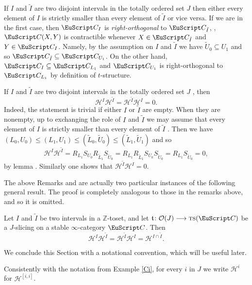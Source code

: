 \begin{remark}
If $I$ and $\tilde{I}$ are two disjoint intervals in the totally ordered set $J$ then either every element of $I$ is strictly smaller than every element of $\tilde{I}$ or vice versa. If we are in the first case, then $\C_{I}$ is \emph{right-orthogonal} to $\C_{\tilde{I}}$, \ie, $\C(X,Y)$ is contractible whenever $X\in \C_{\tilde{I}}$ and $Y\in \C_{I}$. Namely, by the assumption on $I$ and $\tilde{I}$ we have $\tilde{U}_0\subseteq U_1$ and so $\C_{\tilde{I}}\subseteq \C_{U_1}$. On the other hand, $\C_I\subseteq \C_{L_1}$ and $\C_{U_1}$ is right-orthogonal to $\C_{L_1}$ by definition of $t$-structure.
\end{remark}
\begin{remark}\label{rem.questaltro}
If $I$ and $\tilde{I}$ are two disjoint intervals in the totally ordered set $J$ , then 
\[
\mathcal{H}^I\mathcal{H}^{\tilde{I}}=\mathcal{H}^{\tilde{I}}\mathcal{H}^I=0.
\] 
Indeed, the statement is trivial if either $I$ or $\tilde{I}$ are empty. When they are nonempty, up to exchanging the role of $I$ and $\tilde{I}$ we may assume that every element of $I$ is strictly smaller than every element of $\tilde{I}$ . Then we have $(L_0,U_0)\leq (L_1,U_1)\leq (\tilde{L}_0,\tilde{U}_0)\leq (\tilde{L}_1,\tilde{U}_1)$ and so
\[
\mathcal{H}^I\mathcal{H}^{\tilde{I}}=R_{L_1}S_{U_0}R_{\tilde{L}_1}S_{\tilde{U}_0}=R_{L_1}R_{\tilde{L}_1}S_{U_0}S_{\tilde{U}_0}=R_{L_1}S_{\tilde{U}_0}=0,
\]
by lemma . Similarly one shows that $\mathcal{H}^{\tilde{I}}\mathcal{H}^I=0$.
\end{remark}
The above Remarks  and  are actually two particular instances of the following general result. The proof is completely analogous to those in the remarks above, and so it is omitted.
\begin{proposition}\label{H-intersection}
Let $I$ and $\tilde{I}$ be two intervals in a $\mathbb{Z}$-toset, and let $\tee\colon \O(J)\to  \ts(\C)$ be a $J$-slicing on a stable $\infty$-category $\C$. Then
\[
\mathcal{H}^I\mathcal{H}^{\tilde{I}}=\mathcal{H}^{\tilde{I}}\mathcal{H}^I=\mathcal{H}^{I\cap \tilde{I}}.
\]
\end{proposition}
We conclude this Section with a notational convention, which will be useful later. 
\begin{notat}\label{Hi}
Consistently with the notation from Example \ref{Ci},
for every $i$ in $J$ we write $\mathcal{H}^i$ for $\mathcal{H}^{[i,i]}$.
\end{notat}


